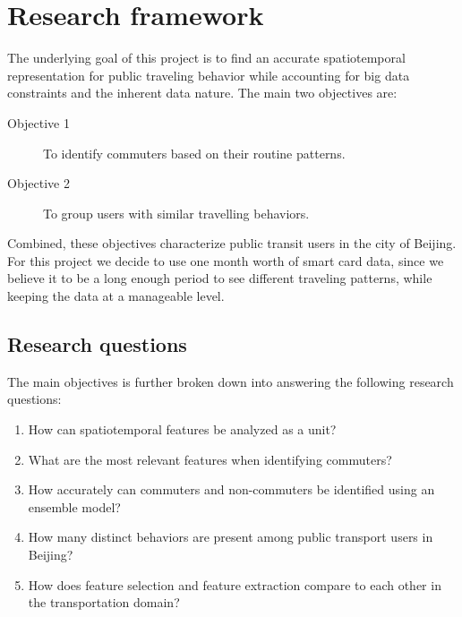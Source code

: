 \documentclass{article}
\begin{document}





\newpage
\section{Research framework}
The underlying goal of this project is to find an accurate spatiotemporal representation for public traveling behavior while accounting for big data constraints and the inherent data nature. The main two objectives are:

\begin{description}
\item[Objective 1] To identify commuters based on their routine patterns. \label{eqn:obj1}
\item[Objective 2] To group users with similar travelling behaviors. \label{eqn:obj2}
\end{description}

Combined, these objectives characterize public transit users in the city of Beijing. For this project we decide to use one month worth of smart card data, since we believe it to be a long enough period to see different traveling patterns, while keeping the data at a manageable level. 

\subsection{Research questions}
The main objectives is further broken down into answering the following research questions: 

\begin{enumerate}

\item How can spatiotemporal features be analyzed as a unit?

\item What are the most relevant features when identifying commuters?

\item How accurately can commuters and non-commuters be identified using an ensemble model? 

\item How many distinct behaviors are present among public transport users in Beijing?

\item How does feature selection and feature extraction compare to each other in the transportation domain?

\end{enumerate}
\end{document}
